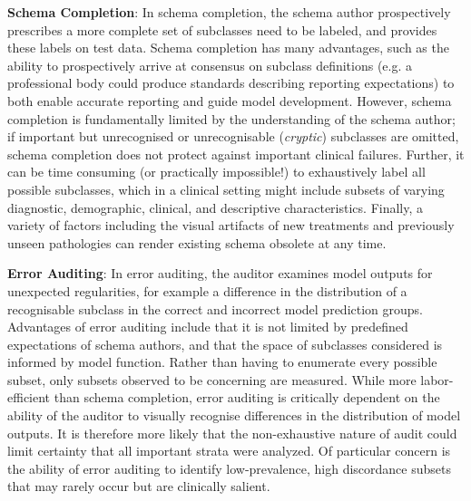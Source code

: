 \documentclass{article}
\begin{document}
\textbf{Schema Completion}: In schema completion, the schema author prospectively prescribes a more complete set of subclasses need to be labeled, and provides these labels on test data. 
Schema completion has many advantages, such as the ability to prospectively arrive at consensus on subclass definitions (e.g. a professional body could produce standards describing reporting expectations) to both enable accurate reporting and guide model development.
However, schema completion is fundamentally limited by the understanding of the schema author; if important but unrecognised or unrecognisable (\textit{cryptic}) subclasses are omitted, schema completion does not protect against important clinical failures.
Further, it can be time consuming (or practically impossible!) to exhaustively label all possible subclasses, which in a clinical setting might include subsets of varying diagnostic, demographic, clinical, and descriptive characteristics.
Finally, a variety of factors including the visual artifacts of new treatments and previously unseen pathologies can render existing schema obsolete at any time.

\textbf{Error Auditing}: In error auditing, the auditor examines model outputs for unexpected regularities, for example a difference in the distribution of a recognisable subclass in the correct and incorrect model prediction groups. 
Advantages of error auditing include that it is not limited by predefined expectations of schema authors, and that the space of subclasses considered is informed by model function.
Rather than having to enumerate every possible subset, only subsets observed to be concerning are measured.
While more labor-efficient than schema completion, error auditing is critically dependent on the ability of the auditor to visually recognise differences in the distribution of model outputs.
It is therefore more likely that the non-exhaustive nature of audit could limit certainty that all important strata were analyzed.
Of particular concern is the ability of error auditing to identify low-prevalence, high discordance subsets that may rarely occur but are clinically salient.
\end{document}
